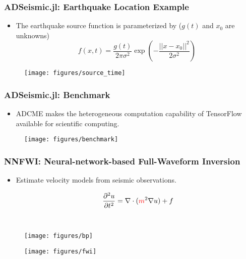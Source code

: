 \documentclass[usenames,dvipsnames]{beamer}
\begin{document}
\begin{frame}
	\frametitle{ADSeismic.jl: Earthquake Location Example}
	\begin{itemize}
		\item The earthquake source function is parameterized by ($g(t)$ and $x_0$ are unknowns)
		$$f(x, t) =  \frac{g(t)}{2\pi \sigma^2} \exp \left( -\frac{||x - x_0||^2}{2 \sigma^2} \right)$$
	\end{itemize}
	\begin{figure}[hbt]
  \texttt{[image: figures/source\_time]}
\end{figure}
\end{frame}


\begin{frame}
	\frametitle{ADSeismic.jl: Benchmark}
	\begin{itemize}
		\item ADCME makes the heterogeneous computation capability of TensorFlow available for scientific computing. 
	\end{itemize}
	\begin{figure}[hbt]
  \texttt{[image: figures/benchmark]}
\end{figure}
\end{frame}

\begin{frame}
	\frametitle{NNFWI: Neural-network-based Full-Waveform Inversion}
	
	\begin{itemize}
		\item Estimate velocity models from seismic observations. 
	\end{itemize}
	\begin{minipage}[t]{0.3\textwidth}
		\begin{equation*}
\qquad\frac{\partial^2 u}{\partial t^2} = \nabla \cdot (\textcolor{red}{m}^2 \nabla u) + f
\end{equation*}
	\end{minipage}~
	\begin{minipage}[t]{0.69\textwidth}
	\begin{figure}[hbt]
	\centering
  \texttt{[image: figures/bp]}
\end{figure}
\end{minipage}
	


\begin{figure}[hbt]
  \texttt{[image: figures/fwi]}
\end{figure}
\end{frame}
\end{document}
